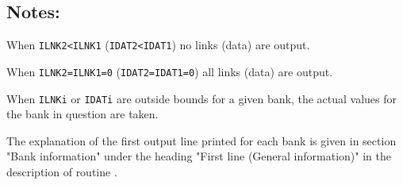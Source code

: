 \subsection{Notes:}
\par
\begin{OL}
\item When {\tt ILNK2<ILNK1} ({\tt IDAT2<IDAT1}) no links (data) are output.
\item When {\tt ILNK2=ILNK1=0} ({\tt IDAT2=IDAT1=0}) all links (data) are
output.
\item When {\tt ILNKi} or {\tt IDATi} are outside bounds for a given bank, the
actual values for the bank in question are taken.
\item The explanation of the
first output line printed for each bank is given in section "Bank information"
under the heading "First line (General information)" in the
description of routine .
\end{OL}
